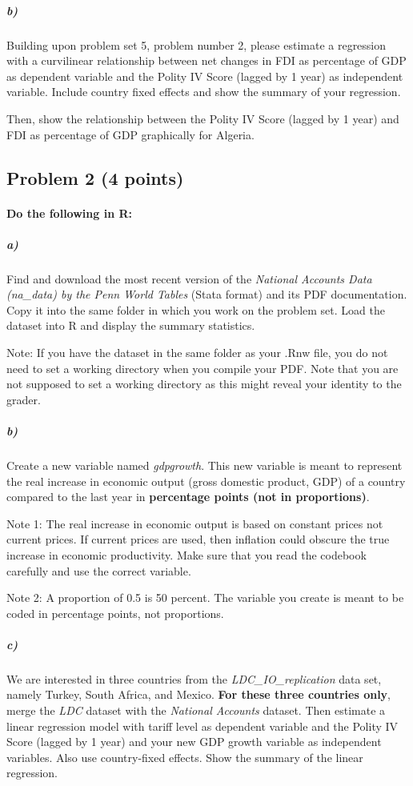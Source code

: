 \documentclass[12pt]{article}
\begin{document}
\subparagraph{b)} Building upon problem set 5, problem number 2, please estimate a regression with a curvilinear relationship between net changes in FDI as percentage of GDP as dependent variable and the Polity IV Score (lagged by 1 year) as independent variable. Include country fixed effects and show the summary of your regression.

Then, show the relationship between the Polity IV Score (lagged by 1 year) and FDI as percentage of GDP graphically for Algeria.



\subsection*{Problem 2 (4 points)}

\paragraph{Do the following in R:}

\subparagraph{a)} Find and download the most recent version of the \textit{National Accounts Data (na\_data) by the Penn World Tables} (Stata format) and its PDF documentation. Copy it into the same folder in which you work on the problem set. Load the dataset into R and display the summary statistics.

Note: If you have the dataset in the same folder as your .Rnw file, you do not need to set a working directory when you compile your PDF. Note that you are not supposed to set a working directory as this might reveal your identity to the grader.

\subparagraph{b)} Create a new variable named \textit{gdpgrowth}. This new variable is meant to represent the real increase in economic output (gross domestic product, GDP) of a country compared to the last year in \textbf{percentage points (not in proportions)}.

Note 1: The real increase in economic output is based on constant prices not current prices. If current prices are used, then inflation could obscure the true increase in economic productivity. Make sure that you read the codebook carefully and use the correct variable.

Note 2: A proportion of 0.5 is 50 percent. The variable you create is meant to be coded in percentage points, not proportions.

\subparagraph{c)} We are interested in three countries from the \textit{LDC\_IO\_replication} data set, namely Turkey, South Africa, and Mexico. \textbf{For these three countries only}, merge the \textit{LDC} dataset with the \textit{National Accounts} dataset. Then estimate a linear regression model with tariff level as dependent variable and the Polity IV Score (lagged by 1 year) and your new GDP growth variable as independent variables. Also use country-fixed effects. Show the summary of the linear regression.
\end{document}
